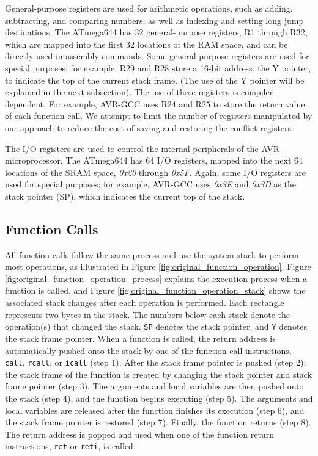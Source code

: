 General-purpose registers are used for arithmetic operations, such as adding, subtracting, and comparing numbers, as well as indexing and setting long jump destinations. The ATmega644 has 32 general-purpose registers, R1 through R32, which are mapped into the first 32 locations of the RAM space, and can be directly used in assembly commands. Some general-purpose registers are used for special purposes; for example, R29 and R28 store a 16-bit address, the Y pointer, to indicate the top of the current stack frame. (The use of the Y pointer will be explained in the next subsection). The use of these registers is compiler-dependent. For example, AVR-GCC uses R24 and R25 to store the return value of each function call. We attempt to limit the number of registers manipulated by our approach to reduce the cost of saving and restoring the conflict registers.

The I/O registers are used to control the internal peripherals of the AVR microprocessor.
The ATmega644 has 64 I/O registers, mapped into the next 64 locations of the SRAM space, \textit{0x20} through \textit{0x5F}. Again, some I/O registers are used for special purposes; for example, AVR-GCC uses \textit{0x3E} and \textit{0x3D} as the stack pointer (SP), which indicates the current top of the stack.
\vspace{-15pt}
\subsection{Function Calls}
\vspace{-5pt}
All function calls follow the same process and use the system stack to perform most operations, as illustrated in Figure \ref{fig:original_function_operation}. Figure \ref{fig:original_function_operation_process} explains the execution process when a function is called, and Figure \ref{fig:original_function_operation_stack} shows the associated stack changes after each operation is performed. Each rectangle represents two bytes in the stack. The numbers below each stack denote the operation(s) that changed the stack. \texttt{SP} denotes the stack pointer, and \texttt{Y} denotes the stack frame pointer. When a function is called, the return address is automatically pushed onto the stack by one of the function call instructions, \texttt{call}, \texttt{rcall}, or \texttt{icall} (step 1). After the stack frame pointer is pushed (step 2), the stack frame of the function is created by changing the stack pointer and stack frame pointer (step 3). The arguments and local variables are then pushed onto the stack (step 4), and the function begins executing (step 5). The arguments and local variables are released after the function finishes its execution (step 6), and the stack frame pointer is restored (step 7). Finally, the function returns (step 8). The return address is popped and used when one of the function return instructions, \texttt{ret} or \texttt{reti}, is called.



